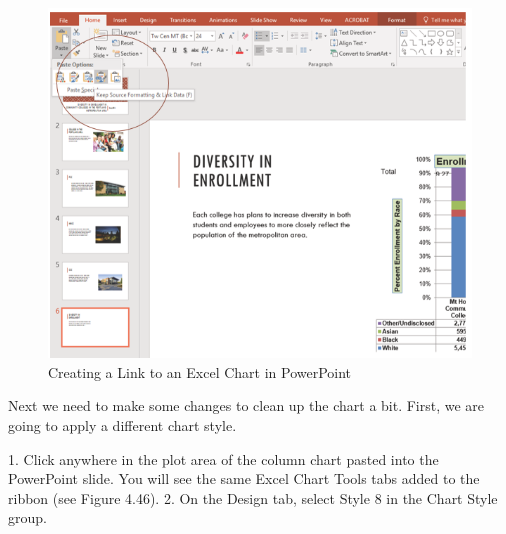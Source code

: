 \begin{figure}[H]
	\centering
	\includegraphics[width=\maxwidth{.95\linewidth}]{gfx/ch04_fig46}
	\caption{Creating a Link to an Excel Chart in PowerPoint}
	\label{04:fig46}
\end{figure}


Next we need to make some changes to clean up the chart a bit. First, we are going to apply a different
chart style.

1. Click anywhere in the plot area of the column chart pasted into the PowerPoint slide. You will
see the same Excel Chart Tools tabs added to the ribbon (see Figure 4.46).
2. On the Design tab, select Style 8 in the Chart Style group.


